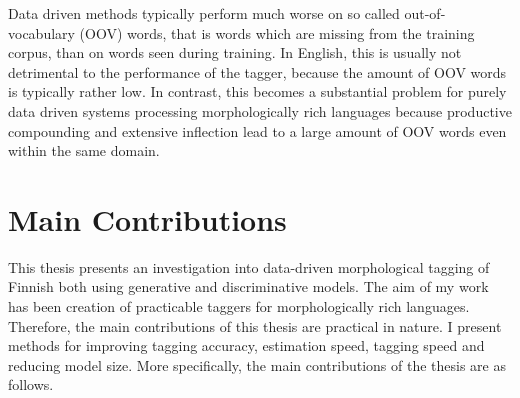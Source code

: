 Data driven methods typically perform much
worse on so called out-of-vocabulary (OOV) words, that is words which
are missing from the training corpus, than on words seen during
training. In English, this is usually not detrimental to the
performance of the tagger, because the amount of OOV words is
typically rather low. In contrast, this becomes a substantial problem
for purely data driven systems processing morphologically rich
languages because productive compounding and extensive inflection lead
to a large amount of OOV words even within the same domain.


\section{Main Contributions}

This thesis presents an investigation into data-driven morphological
tagging of Finnish both using generative and discriminative
models. The aim of my work has been creation of practicable taggers
for morphologically rich languages. Therefore, the main contributions
of this thesis are practical in nature. I present methods for
improving tagging accuracy, estimation speed, tagging speed and reducing
model size. More specifically, the main contributions of the thesis
are as follows.

